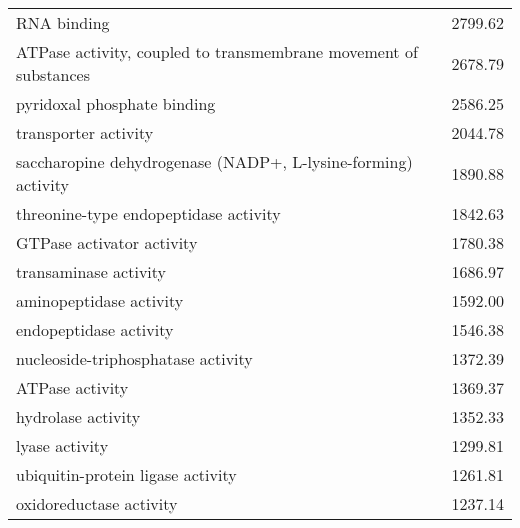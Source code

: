 \begin{table}[h]
\begin{center}
\begin{tabular}{p{}r}
RNA binding                                                                                    & 2799.62                     \\
ATPase activity, coupled to transmembrane movement of substances                               & 2678.79                     \\
pyridoxal phosphate binding                                                                    & 2586.25                     \\
transporter activity                                                                           & 2044.78                     \\
saccharopine dehydrogenase (NADP+, L-lysine-forming) activity                                  & 1890.88                     \\
threonine-type endopeptidase activity                                                          & 1842.63                     \\
GTPase activator activity                                                                      & 1780.38                     \\
transaminase activity                                                                          & 1686.97                     \\
aminopeptidase activity                                                                        & 1592.00                     \\
endopeptidase activity                                                                         & 1546.38                     \\
nucleoside-triphosphatase activity                                                             & 1372.39                     \\
ATPase activity                                                                                & 1369.37                     \\
hydrolase activity                                                                             & 1352.33                     \\
lyase activity                                                                                 & 1299.81                     \\
ubiquitin-protein ligase activity                                                              & 1261.81                     \\
oxidoreductase activity                                                                        & 1237.14                     \\

\end{tabular}
\end{center}
\end{table}
